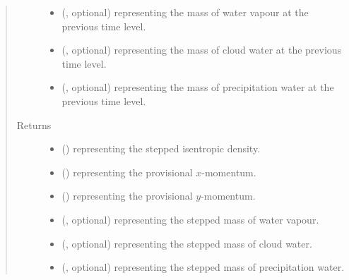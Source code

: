 \documentclass[letterpaper,10pt,english]{sphinxmanual}
\begin{document}
\begin{fulllineitems}
\begin{fulllineitems}
\begin{quote}
\begin{description}
\begin{itemize}
\item {} 
 (, optional) \textendash{}  representing the mass of water vapour at the previous time level.

\item {} 
 (, optional) \textendash{}  representing the mass of cloud water at the previous time level.

\item {} 
 (, optional) \textendash{}  representing the mass of precipitation water at the previous time level.

\end{itemize}

\item[{Returns}] \leavevmode
\begin{itemize}
\item {} 
 () \textendash{}  representing the stepped isentropic density.

\item {} 
 () \textendash{}  representing the provisional \(x\)-momentum.

\item {} 
 () \textendash{}  representing the provisional \(y\)-momentum.

\item {} 
 (, optional) \textendash{}  representing the stepped mass of water vapour.

\item {} 
 (, optional) \textendash{}  representing the stepped mass of cloud water.

\item {} 
 (, optional) \textendash{}  representing the stepped mass of precipitation water.

\end{itemize}


\end{description}\end{quote}


\end{fulllineitems}
\end{fulllineitems}
\end{document}
